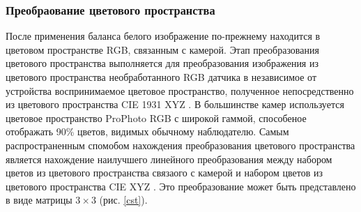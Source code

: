 \subsubsection{Преобраование цветового пространства}

После применения баланса белого изображение по-прежнему находится в цветовом пространстве RGB, связанным с камерой. Этап преобразования цветового пространства выполняется для преобразования изображения из цветового пространства необработанного RGB датчика в независимое от устройства воспринимаемое цветовое пространство, полученное непосредственно из цветового пространства CIE 1931 XYZ \cite{lib-cie}. В большинстве камер используется цветовое пространство ProPhoto RGB с широкой гаммой, способеное отображать 90\% цветов, видимых обычному наблюдателю. Самым распространенным спомобом нахождения преобразования цветового пространства является нахождение наилучшего линейного преобразования между набором цветов из цветового пространства связаого с камерой и набором цветов из цветового пространства CIE XYZ \cite{lib-brown-cst}. Это преобразование может быть представлено в виде матрицы $3 \times 3$ (рис. \ref{cst}).

